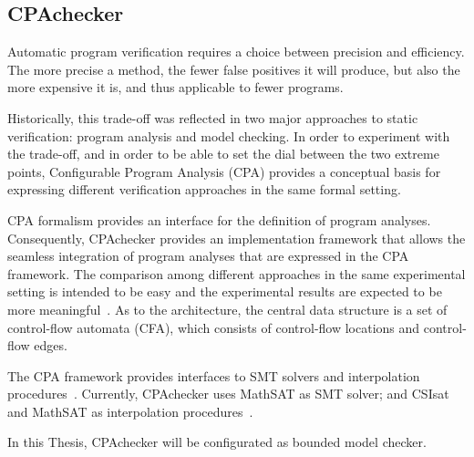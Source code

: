 \subsection{CPAchecker}

Automatic program verification requires a choice between precision and efficiency. The more precise a method, the fewer false positives it will produce, but also the more expensive it is, and thus applicable to fewer programs. 

Historically, this trade-off was reflected in two major approaches to static verification: program analysis and model checking. In order to experiment with the trade-off, and in order to be able to set the dial between the two extreme points, Configurable Program Analysis (CPA) provides a conceptual basis for expressing different verification approaches in the same formal setting. 

CPA formalism provides an interface for the definition of program analyses. Consequently, CPAchecker provides an implementation framework that allows the seamless integration of program analyses that are expressed in the CPA framework. The comparison among different approaches in the same experimental setting is intended to be easy and the experimental results are expected to be more meaningful~\cite{Beyer2011}. As to the architecture, the central data structure is a set of control-flow automata (CFA), which consists of control-flow locations and control-flow edges. 

The CPA framework provides interfaces to SMT solvers and interpolation procedures~\cite{Beyer2011}. Currently, CPAchecker uses MathSAT as SMT solver; and CSIsat and MathSAT as interpolation procedures~\cite{Beyer2011}. %

In this Thesis, CPAchecker will be configurated as bounded model checker.

